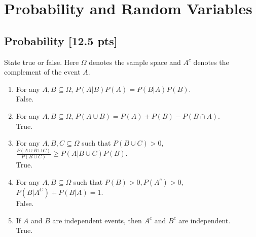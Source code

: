 \documentclass[a4paper]{article}
\theoremstyle{definition}
\newenvironment{soln}{
	\leavevmode\color{blue}\ignorespaces
}{}
\begin{document}
	
	\section{Probability and Random Variables }
	\subsection{Probability [12.5 pts]}
	State true or false. Here $\Omega$ denotes the sample space and $A^c$ denotes the complement of the event $A$.
	\begin{enumerate}
		\item For any $A, B \subseteq \Omega$, $P(A|B)P(A) = P(B|A)P(B)$.\\
		\begin{soln} False. \end{soln}
		
		\item For any $A, B \subseteq \Omega$, $P(A \cup B) = P(A) + P(B) - P(B \cap A)$.\\         
		\begin{soln} True. \end{soln}
		
		\item For any $A, B, C \subseteq \Omega$ such that $P(B \cup C) > 0$,
		$\frac{P(A \cup B \cup C)}{P(B \cup C)} \geq P(A | B \cup C) P(B)$.\\ 
		\begin{soln}  True. \end{soln}
		
		\item For any $A, B\subseteq\Omega$ such that $P(B) > 0, P(A^c) > 0$,
		$P(B|A^C) + P(B|A) = 1$.\\ 
		\begin{soln} False. \end{soln}
		
		\item If $A$ and $B$ are independent events, then $A^{c}$ and $B^{c}$ are independent.\\
		\begin{soln} True. \end{soln}
		
	\end{enumerate}
	
\end{document}
